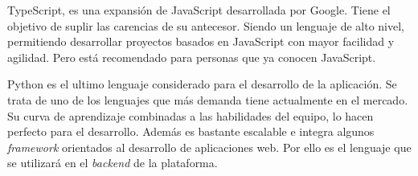 TypeScript, es una expansión de JavaScript desarrollada por Google. Tiene el objetivo de suplir las carencias de su antecesor. Siendo un lenguaje de alto nivel, permitiendo desarrollar proyectos basados en JavaScript con mayor facilidad y agilidad. Pero está recomendado para personas que ya conocen JavaScript.

Python es el ultimo lenguaje considerado para el desarrollo de la aplicación. Se trata de uno de los lenguajes que más demanda tiene actualmente en el mercado. Su curva de aprendizaje combinadas a las habilidades del equipo, lo hacen perfecto para el desarrollo. Además es bastante escalable e integra algunos \emph{framework} orientados al desarrollo de aplicaciones web. Por ello es el lenguaje que se utilizará en el \emph{backend} de la plataforma.